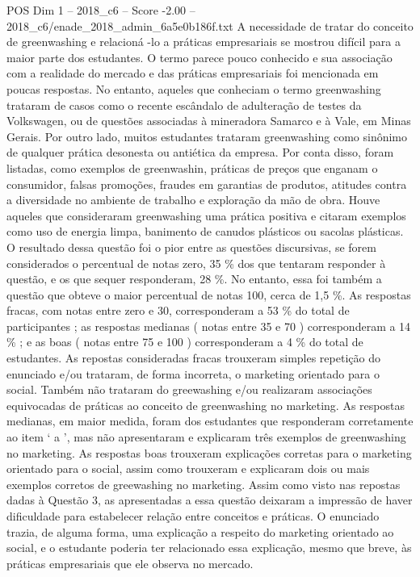 \begin{textsample}{POS Dim 1 – 2018\_c6 – Score -2.00 – 2018\_c6/enade\_2018\_admin\_6a5e0b186f.txt}
A necessidade de tratar do conceito de greenwashing e relacioná -lo a práticas empresariais se mostrou difícil para a maior parte dos estudantes.
O termo parece pouco conhecido e sua associação com a realidade do mercado e das práticas empresariais foi mencionada em poucas respostas.
No entanto, aqueles que conheciam o termo greenwashing trataram de casos como o recente escândalo de adulteração de testes da Volkswagen, ou de questões associadas à mineradora Samarco e à Vale, em Minas Gerais.
Por outro lado, muitos estudantes trataram greenwashing como sinônimo de qualquer prática desonesta ou antiética da empresa.
Por conta disso, foram listadas, como exemplos de greenwashin, práticas de preços que enganam o consumidor, falsas promoções, fraudes em garantias de produtos, atitudes contra a diversidade no ambiente de trabalho e exploração da mão de obra.
Houve aqueles que consideraram greenwashing uma prática positiva e citaram exemplos como uso de energia limpa, banimento de canudos plásticos ou sacolas plásticas.
O resultado dessa questão foi o pior entre as questões discursivas, se forem considerados o percentual de notas zero, 35 \% dos que tentaram responder à questão, e os que sequer responderam, 28 \%.
No entanto, essa foi também a questão que obteve o maior percentual de notas 100, cerca de 1,5 \%.
As respostas fracas, com notas entre zero e 30, corresponderam a 53 \% do total de participantes ; as respostas medianas ( notas entre 35 e 70 ) corresponderam a 14 \% ; e as boas ( notas entre 75 e 100 ) corresponderam a 4 \% do total de estudantes.
As repostas consideradas fracas trouxeram simples repetição do enunciado e/ou trataram, de forma incorreta, o marketing orientado para o social.
Também não trataram do greewashing e/ou realizaram associações equivocadas de práticas ao conceito de greenwashing no marketing.
As respostas medianas, em maior medida, foram dos estudantes que responderam corretamente ao item ‘ a ’, mas não apresentaram e explicaram três exemplos de greenwashing no marketing.
As respostas boas trouxeram explicações corretas para o marketing orientado para o social, assim como trouxeram e explicaram dois ou mais exemplos corretos de greewashing no marketing.
Assim como visto nas repostas dadas à Questão 3, as apresentadas a essa questão deixaram a impressão de haver dificuldade para estabelecer relação entre conceitos e práticas.
O enunciado trazia, de alguma forma, uma explicação a respeito do marketing orientado ao social, e o estudante poderia ter relacionado essa explicação, mesmo que breve, às práticas empresariais que ele observa no mercado.

\end{textsample}
